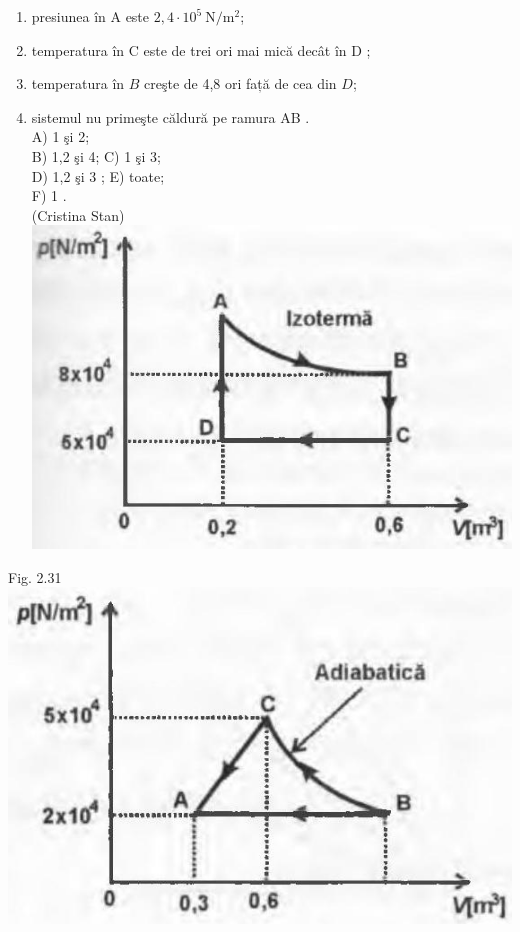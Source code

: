 \documentclass[10pt]{article}
\begin{document}
\begin{enumerate}
  \item presiunea în A este $2,4 \cdot 10^{5} \mathrm{~N} / \mathrm{m}^{2}$;
  \item temperatura în C este de trei ori mai mică decât în D ;
  \item temperatura în $B$ creşte de 4,8 ori față de cea din $D$;
  \item sistemul nu primeşte căldură pe ramura AB .\\
A) 1 şi 2;\\
B) 1,2 şi 4; C) 1 şi 3;\\
D) 1,2 şi 3 ; E) toate;\\
F) 1 .\\
(Cristina Stan)\\
\includegraphics[max width=\textwidth, center]{2025_07_01_5b3ff9fa0d508c8e9f17g-121}
\end{enumerate}

Fig. 2.31\\
\includegraphics[max width=\textwidth, center]{2025_07_01_5b3ff9fa0d508c8e9f17g-121(1)}
\end{document}
